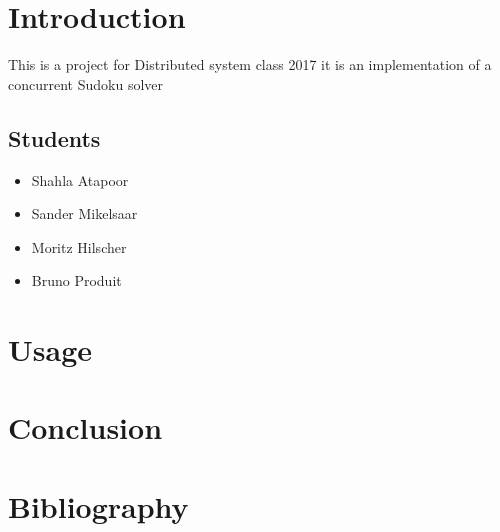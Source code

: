 \documentclass{article}             		%
\begin{document}
  
    \section{Introduction}
    This is a project for Distributed system class 2017
    it is an implementation of a concurrent Sudoku solver
    \subsection{Students}
    \begin{itemize}
    \item Shahla Atapoor
    \item Sander Mikelsaar
    \item Moritz Hilscher
    \item Bruno Produit
    \end{itemize}
    
    \section{Usage}

    \section{Conclusion}
    \section{Bibliography}
\end{document}
